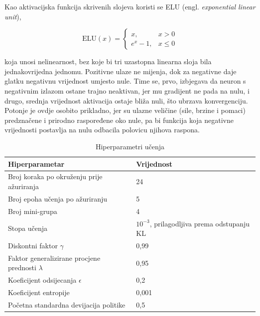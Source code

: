 Kao aktivacijska funkcija skrivenih slojeva koristi se ELU (engl. \textit{exponential linear
    unit}),

\begin{equation}
    \mathrm{ELU}(x) =
    \begin{cases}
        x,         & x > 0    \\
        e^{x} - 1, & x \leq 0
    \end{cases}
    \label{eq:elu}
\end{equation}

koja unosi nelinearnost, bez koje bi tri uzastopna linearna sloja bila jednakovrijedna jednomu.
Pozitivne ulaze ne mijenja, dok za negativne daje glatku negativnu
vrijednost umjesto nule. Time se, prvo, izbjegava da neuron s negativnim izlazom ostane trajno
neaktivan, jer mu gradijent ne pada na nulu, i drugo, srednja vrijednost aktivacija ostaje bliža
nuli, što ubrzava konvergenciju. Potonje je ovdje osobito prikladno, jer su ulazne veličine
(sile, brzine i pomaci) predznačene i prirodno raspoređene oko nule, pa bi funkcija koja
negativne vrijednosti postavlja na nulu odbacila polovicu njihova raspona.

\begin{table}[H]
    \centering
    \caption{Hiperparametri učenja}
    \label{tab:ppo}
    \begin{tabular}{@{}ll@{}}
        \toprule
        Hiperparametar                                     & Vrijednost                                   \\
        \midrule
        Broj koraka po okruženju prije ažuriranja          & 24                                           \\
        Broj epoha učenja po ažuriranju                    & 5                                            \\
        Broj mini-grupa                                    & 4                                            \\
        Stopa učenja                                       & $10^{-3}$, prilagodljiva prema odstupanju KL \\
        Diskontni faktor $\gamma$                          & 0,99                                         \\
        Faktor generalizirane procjene prednosti $\lambda$ & 0,95                                         \\
        Koeficijent odsijecanja $\epsilon$                 & 0,2                                          \\
        Koeficijent entropije                              & 0,001                                        \\
        Početna standardna devijacija politike             & 0,5                                          \\
        \bottomrule
    \end{tabular}
\end{table}

